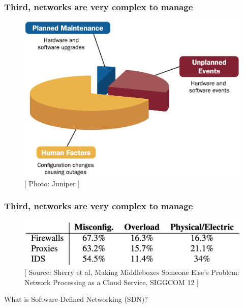 \documentclass{beamer}
\begin{document}
\begin{frame}
  \frametitle{Third, networks are very complex to manage}
  \begin{figure}
    \begin{center}
      \includegraphics[scale=0.25]{images/sdn-5}
    \end{center}
    
    \caption{\small{[ Photo: Juniper ]}}
  \end{figure}
\end{frame}
\begin{frame}
  \frametitle{Third, networks are very complex to manage}
  \begin{figure}
    \begin{center}
      \includegraphics[scale=0.25]{images/sdn-6}
    \end{center}
    
    \caption{\small{[ Source: Sherry et al, Making Middleboxes Someone Else's Problem:
                                  Network Processing as a Cloud Service, SIGGCOM 12 ]}}
  \end{figure}
\end{frame}


\begin{frame}[plain]
  \begin{center}
  \large What is Software-Defined Networking (SDN)?
  \end{center}
  \addtocounter{framenumber}{-1}
\end{frame}
\end{document}

